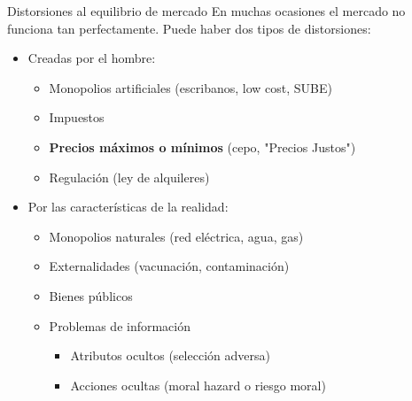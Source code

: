 \documentclass{beamer}
\begin{document}
\begin{frame}{Distorsiones al equilibrio de mercado}
    En muchas ocasiones el mercado no funciona tan perfectamente. Puede haber dos tipos de distorsiones: \vspace{1mm}
    \begin{itemize}
        \item Creadas por el hombre:
        \begin{itemize}
            \item Monopolios artificiales (escribanos, low cost, SUBE)
             \vspace{1mm}
             \item Impuestos
             \vspace{1mm}
            \item \textbf{Precios máximos o mínimos} (cepo, "Precios Justos")
             \vspace{1mm}
            \item Regulación (ley de alquileres)
        \end{itemize}
        \vspace{1mm}
        \item Por las características de la realidad:
        \begin{itemize}
            \item Monopolios naturales (red eléctrica, agua, gas)   
             \vspace{1mm}
            \item Externalidades (vacunación, contaminación)
             \vspace{1mm}
            \item Bienes públicos
            \vspace{1mm}
            \item Problemas de información
            \begin{itemize}
                \item Atributos ocultos (selección adversa)
                 \vspace{1mm}
                \item Acciones ocultas (moral hazard o riesgo moral)
            \end{itemize}        
        \end{itemize}
    \end{itemize}
\end{frame}
\end{document}
